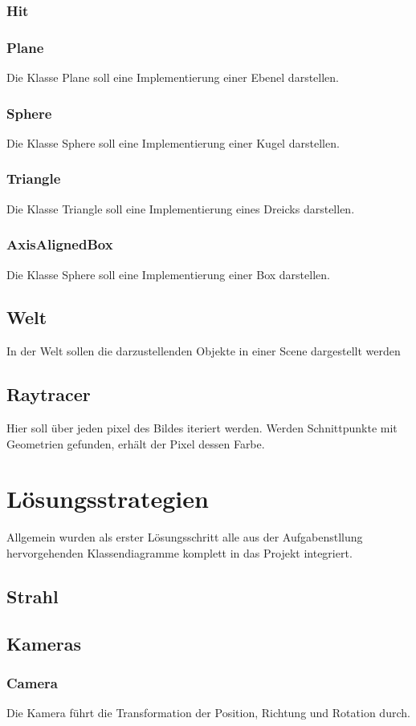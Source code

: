 \documentclass[14pt]{extarticle}
\begin{document}
\subsubsection{Hit}
\subsubsection{Plane}
Die Klasse Plane soll eine Implementierung einer Ebenel darstellen. 
\subsubsection{Sphere}
Die Klasse Sphere soll eine Implementierung einer Kugel darstellen. 
\subsubsection{Triangle}
Die Klasse Triangle soll eine Implementierung eines Dreicks darstellen. 
\subsubsection{AxisAlignedBox}
Die Klasse Sphere soll eine Implementierung einer Box darstellen. 
\subsection{Welt}
In der Welt sollen die darzustellenden Objekte in einer Scene dargestellt werden
\subsection{Raytracer}
Hier soll über jeden pixel des Bildes iteriert werden. Werden Schnittpunkte mit Geometrien gefunden, erhält der Pixel dessen Farbe.


\section{Lösungsstrategien}
Allgemein wurden als erster Lösungsschritt alle aus der Aufgabenstllung hervorgehenden Klassendiagramme komplett in das Projekt integriert.

\subsection{Strahl}
\subsection{Kameras}
\subsubsection{Camera}
Die Kamera führt die Transformation der Position, Richtung und Rotation durch.
\end{document}
